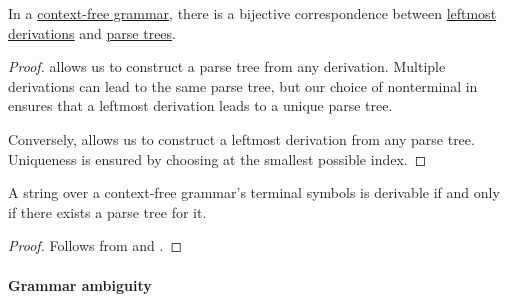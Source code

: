 \begin{proposition}\label{thm:derivations_and_parse_trees}
  In a \hyperref[def:chomsky_hierarchy/context_free]{context-free grammar}, there is a bijective correspondence between \hyperref[def:leftmost_derivation]{leftmost derivations} and \hyperref[def:parse_tree]{parse trees}.
\end{proposition}
\begin{proof}
   allows us to construct a parse tree from any derivation. Multiple derivations can lead to the same parse tree, but our choice of nonterminal in  ensures that a leftmost derivation leads to a unique parse tree.

  Conversely,  allows us to construct a leftmost derivation from any parse tree. Uniqueness is ensured by choosing at  the smallest possible index.
\end{proof}

\begin{corollary}\label{thm:parse_tree_existence}
   A string over a context-free grammar's terminal symbols is derivable if and only if there exists a parse tree for it.
\end{corollary}
\begin{proof}
  Follows from  and .
\end{proof}

\paragraph{Grammar ambiguity}

